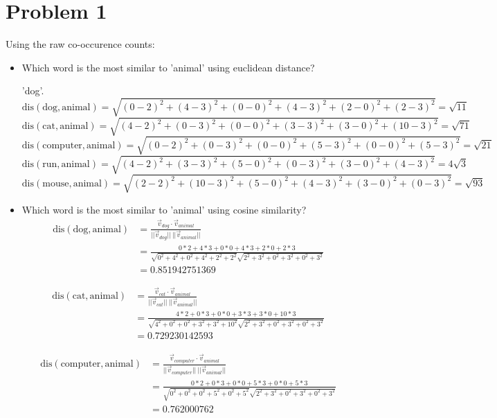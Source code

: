 \documentclass[twoside,11pt]{homework}
\date{\today} %
\begin{document}
\maketitle

\section*{Problem 1}

Using the raw co-occurence counts:
\begin{itemize}
\item Which word is the most similar to 'animal' using euclidean distance?

  'dog'.
  \[
    \text{dis}(\text{dog}, \text{animal})
    = \sqrt{(0-2)^2+(4-3)^2+(0-0)^2+(4-3)^2+(2-0)^2+(2-3)^2}
    = \sqrt{11}
  \]
  \[
    \text{dis}(\text{cat}, \text{animal})
    = \sqrt{(4-2)^2+(0-3)^2+(0-0)^2+(3-3)^2+(3-0)^2+(10-3)^2}
    = \sqrt{71}
  \]
  \[
    \text{dis}(\text{computer}, \text{animal})
    = \sqrt{(0-2)^2+(0-3)^2+(0-0)^2+(5-3)^2+(0-0)^2+(5-3)^2}
    = \sqrt{21}
  \]
  \[
    \text{dis}(\text{run}, \text{animal})
    = \sqrt{(4-2)^2+(3-3)^2+(5-0)^2+(0-3)^2+(3-0)^2+(4-3)^2}
    = 4 \sqrt{3}
  \]
  \[
    \text{dis}(\text{mouse}, \text{animal})
    = \sqrt{(2-2)^2+(10-3)^2+(5-0)^2+(4-3)^2+(3-0)^2+(0-3)^2}
    = \sqrt{93}
  \]
\item Which word is the most similar to 'animal' using cosine similarity?
  \[
  \begin{aligned}
  \text{dis}(\text{dog}, \text{animal})
  &= \frac{\vec{v}_{dog} \cdot \vec{v}_{animal}}{||\vec{v}_{dog}|| \ ||\vec{v}_{animal}||}\\
  &= \frac{0*2 + 4*3 + 0*0 + 4*3 + 2*0 + 2*3}{ \sqrt{0^2+4^2+0^2+4^2+2^2+2^2}
    \sqrt{2^2+3^2+0^2+3^2+0^2+3^2}}\\
  &= 0.851942751369
  \end{aligned}
  \]

  \[
  \begin{aligned}
  \text{dis}(\text{cat}, \text{animal})
  &= \frac{\vec{v}_{cat} \cdot \vec{v}_{animal}}{||\vec{v}_{cat}|| \ ||\vec{v}_{animal}||}\\
  &= \frac{4*2 + 0*3 + 0*0 + 3*3 + 3*0 + 10*3}{ \sqrt{4^2+0^2+0^2+3^2+3^2+10^2}
    \sqrt{2^2+3^2+0^2+3^2+0^2+3^2}}\\
  &= 0.729230142593
  \end{aligned}
  \]

  \[
  \begin{aligned}
  \text{dis}(\text{computer}, \text{animal})
  &= \frac{\vec{v}_{computer} \cdot \vec{v}_{animal}}{||\vec{v}_{computer}|| \ ||\vec{v}_{animal}||}\\
  &= \frac{0*2 + 0*3 + 0*0 + 5*3 + 0*0 + 5*3}{ \sqrt{0^2+0^2+0^2+5^2+0^2+5^2}
    \sqrt{2^2+3^2+0^2+3^2+0^2+3^2}}\\
  &= 0.762000762
  \end{aligned}
  \]


\end{itemize}
\end{document}
